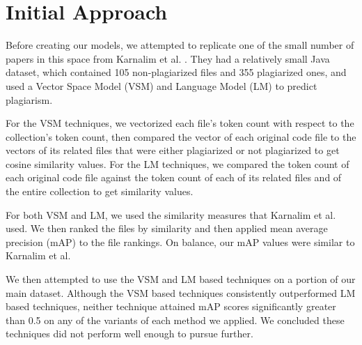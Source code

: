 \documentclass[twocolumn]{article}
\begin{document}
\section{\large Initial Approach}

Before creating our models, we attempted to replicate one of the small number of papers in this space from Karnalim et al. \cite{karnalim2019}. They had a relatively small Java dataset, which contained 105 non-plagiarized files and 355 plagiarized ones, and used a Vector Space Model (VSM) and Language Model (LM) to predict plagiarism. 

For the VSM techniques, we vectorized each file's token count with respect to the collection's token count, then compared the vector of each original code file to the vectors of its related files that were either plagiarized or not plagiarized to get cosine similarity values. For the LM techniques, we compared the token count of each original code file against the token count of each of its related files and of the entire collection to get similarity values.

For both VSM and LM, we used the similarity measures that Karnalim et al. used. We then ranked the files by similarity and then applied mean average precision (mAP) to the file rankings. On balance, our mAP values were similar to Karnalim et al.

We then attempted to use the VSM and LM based techniques on a portion of our main dataset. Although the VSM based techniques consistently outperformed LM based techniques, neither technique attained mAP scores significantly greater than 0.5 on any of the variants of each method we applied.  We concluded these techniques did not perform well enough to pursue further.  
\end{document}
